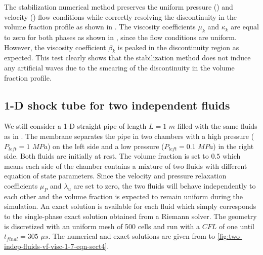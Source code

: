 %
The stabilization numerical method preserves the uniform pressure () and velocity () flow conditions while correctly resolving the discontinuity in the volume fraction profile as shown in . The viscosity coefficients $\mu_k$ and $\kappa_k$ are equal to zero for both phases as shown in , since the flow conditions are uniform. However, the viscosity coefficient $\beta_k$ is peaked in the discontinuity region as expected. This test clearly shows that the stabilization method does not induce any artificial waves due to the smearing of the discontinuity in the volume fraction profile.
\subsection{1-D shock tube for two independent fluids}\label{sec:1d-2-ind-phases-7-eq-sct4}
We still consider a 1-D straight pipe of length $L=1$ $m$ filled with the same fluids as in . The membrane separates the pipe in two chambers with a high pressure ($P_{left} = 1$ $MPa$) on the left side and a low pressure ($P_{left} = 0.1$ $MPa$) in the right side. Both fluids are initially at rest. The volume fraction is set to $0.5$ which means each side of the chamber contains a mixture of two fluids with different equation of state parameters. Since the velocity and pressure relaxation coefficients $\mu_P$ and $\lambda_u$ are set to zero, the two fluids will behave independently to each other and the volume fraction is expected to remain uniform during the simulation. An exact solution is available for each fluid which simply corresponds to the single-phase exact solution obtained from a Riemann solver. The geometry is discretized with an uniform mesh of 500 cells and run with a $CFL$ of one until $t_{final} = 305$ $\mu s$. The numerical and exact solutions are given from  to \ref{fig:two-indep-fluids-vf-visc-1-7-eqn-sect4}.
%
